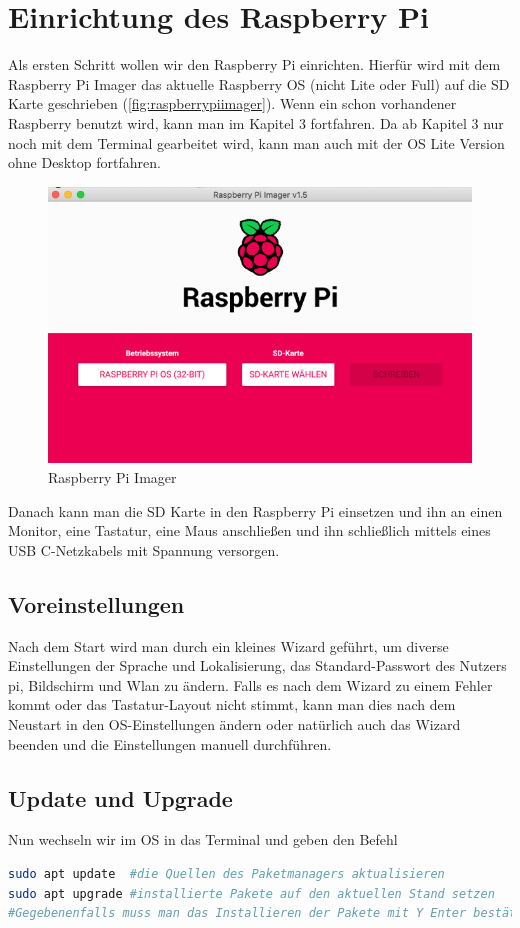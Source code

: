 \section{Einrichtung des Raspberry Pi} \label{sec:raspiEin}

Als ersten Schritt wollen wir den Raspberry Pi einrichten. Hierfür wird mit dem Raspberry Pi Imager das aktuelle Raspberry OS (nicht Lite oder Full) auf die SD Karte geschrieben (\autoref{fig:raspberrypiimager}). Wenn ein schon vorhandener Raspberry benutzt wird, kann man im Kapitel 3 fortfahren. Da ab Kapitel 3 nur noch mit dem Terminal gearbeitet wird, kann man auch mit der OS Lite Version ohne Desktop fortfahren. 
\begin{figure}[H]
	\centering
	\includegraphics[width=0.7\linewidth]{abb/RaspberryPiImager}
	\caption{Raspberry Pi Imager}
	\label{fig:raspberrypiimager}
\end{figure}

Danach kann man die SD Karte in den Raspberry Pi einsetzen und ihn an einen Monitor, eine Tastatur, eine Maus anschließen und ihn schließlich mittels eines USB C-Netzkabels mit Spannung versorgen.
\subsection{Voreinstellungen}
Nach dem Start wird man durch ein kleines Wizard geführt, um diverse Einstellungen der Sprache und Lokalisierung, das Standard-Passwort des Nutzers pi, Bildschirm und Wlan zu ändern.
Falls es nach dem Wizard zu einem Fehler kommt oder das Tastatur-Layout nicht stimmt, kann man dies nach dem Neustart in den OS-Einstellungen ändern oder natürlich auch das Wizard beenden und die Einstellungen manuell durchführen.
\subsection{Update und Upgrade}
Nun wechseln wir im OS in das Terminal und geben den Befehl
\begin{lstlisting}[language=Bash]
sudo apt update  #die Quellen des Paketmanagers aktualisieren
sudo apt upgrade #installierte Pakete auf den aktuellen Stand setzen
#Gegebenenfalls muss man das Installieren der Pakete mit Y Enter bestätigen
\end{lstlisting}
